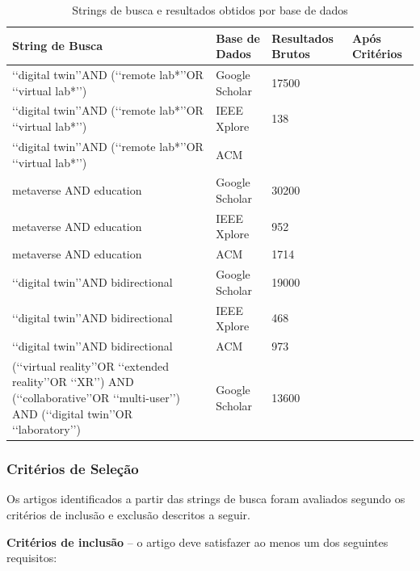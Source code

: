 \documentclass[12pt]{article}
\begin{document}
\begin{table}[h]
    \centering
    \caption{Strings de busca e resultados obtidos por base de dados}
    \begin{tabular}{| p{6cm} | p{1.5cm} | p{1.75cm} | p{1.5cm} |}
        \hline
        \textbf{String de Busca} & \textbf{Base de Dados} & \textbf{Resultados Brutos} & \textbf{Após Critérios} \\ \hline
        \lq\lq digital twin\rq\rq AND (\lq\lq remote lab*\rq\rq OR \lq\lq virtual lab*\rq\rq) & Google Scholar & 17500 & \\ \hline
        \lq\lq digital twin\rq\rq AND (\lq\lq remote lab*\rq\rq OR \lq\lq virtual lab*\rq\rq) & IEEE Xplore & 138 & \\ \hline
        \lq\lq digital twin\rq\rq AND (\lq\lq remote lab*\rq\rq OR \lq\lq virtual lab*\rq\rq) & ACM &  & \\ \hline
        metaverse AND education & Google Scholar & 30200 & \\ \hline
        metaverse AND education & IEEE Xplore & 952 & \\ \hline
        metaverse AND education & ACM & 1714 & \\ \hline
        \lq\lq digital twin\rq\rq AND bidirectional & Google Scholar & 19000 & \\ \hline
        \lq\lq digital twin\rq\rq AND bidirectional & IEEE Xplore & 468 & \\ \hline
        \lq\lq digital twin\rq\rq AND bidirectional & ACM & 973 & \\ \hline
        (\lq\lq virtual reality\rq\rq OR \lq\lq extended reality\rq\rq OR \lq\lq XR\rq\rq) AND (\lq\lq collaborative\rq\rq OR \lq\lq multi-user\rq\rq) AND (\lq\lq digital twin\rq\rq OR \lq\lq laboratory\rq\rq) & Google Scholar & 13600 & \\ \hline
    \end{tabular}
    \label{tab:search_strings}
\end{table}

\subsubsection{Critérios de Seleção}
\label{criterios}

Os artigos identificados a partir das strings de busca foram avaliados segundo os critérios de inclusão e exclusão descritos a seguir.

\textbf{Critérios de inclusão} -- o artigo deve satisfazer ao menos um dos seguintes requisitos:
\end{document}
